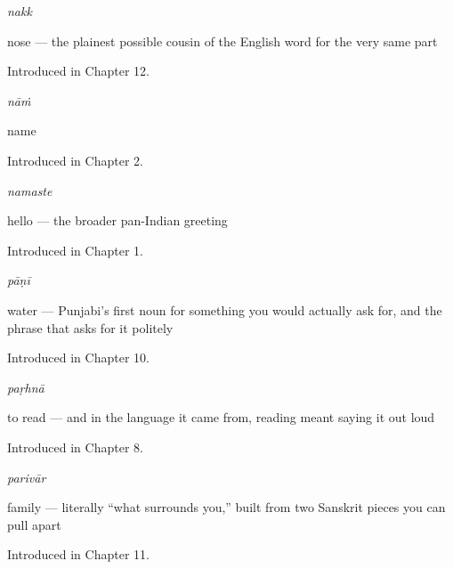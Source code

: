 \noindent\begin{minipage}[t]{\linewidth}
\raggedright
\textbf{}\enspace\emph{nakk}\par
\small nose — the plainest possible cousin of the English word for the very same part\par
\footnotesize Introduced in Chapter 12.
\end{minipage}\par\medskip

\noindent\begin{minipage}[t]{\linewidth}
\raggedright
\textbf{}\enspace\emph{nāṁ}\par
\small name\par
\footnotesize Introduced in Chapter 2.
\end{minipage}\par\medskip

\noindent\begin{minipage}[t]{\linewidth}
\raggedright
\textbf{}\enspace\emph{namaste}\par
\small hello — the broader pan-Indian greeting\par
\footnotesize Introduced in Chapter 1.
\end{minipage}\par\medskip

\noindent\begin{minipage}[t]{\linewidth}
\raggedright
\textbf{}\enspace\emph{pāṇī}\par
\small water — Punjabi's first noun for something you would actually ask for, and the phrase that asks for it politely\par
\footnotesize Introduced in Chapter 10.
\end{minipage}\par\medskip

\noindent\begin{minipage}[t]{\linewidth}
\raggedright
\textbf{}\enspace\emph{paṛhnā}\par
\small to read — and in the language it came from, reading meant saying it out loud\par
\footnotesize Introduced in Chapter 8.
\end{minipage}\par\medskip

\noindent\begin{minipage}[t]{\linewidth}
\raggedright
\textbf{}\enspace\emph{parivār}\par
\small family — literally \textquotedblleft{}what surrounds you,\textquotedblright{} built from two Sanskrit pieces you can pull apart\par
\footnotesize Introduced in Chapter 11.
\end{minipage}\par\medskip

